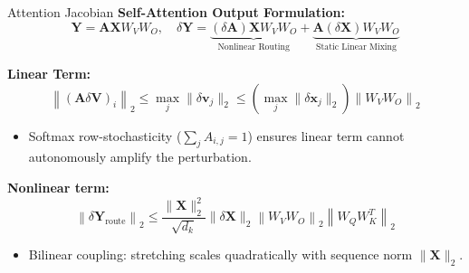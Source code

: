\documentclass[10pt,aspectratio=169]{beamer}
\begin{document}
\begin{frame}{Attention Jacobian}
  \textbf{Self-Attention Output Formulation:}
  \begin{equation*}
    \mathbf{Y} = \mathbf{A} \mathbf{X} W_V W_O, \quad \delta \mathbf{Y} = \underbrace{(\delta \mathbf{A}) \mathbf{X} W_V W_O}_{\text{Nonlinear Routing}} + \underbrace{\mathbf{A} (\delta \mathbf{X}) W_V W_O}_{\text{Static Linear Mixing}}
  \end{equation*}

  \textbf{Linear Term:}
  \begin{equation*}
    \left\| (\mathbf{A} \delta \mathbf{V})_i \right\|_2 \le \max_j \|\delta \mathbf{v}_j\|_2 \le \left(\max_j \|\delta \mathbf{x}_j\|_2\right) \left\| W_V W_O \right\|_2
  \end{equation*}
  \begin{itemize}
    \item Softmax row-stochasticity ($\sum_j A_{i,j}=1$) ensures linear term cannot autonomously amplify the perturbation.
  \end{itemize}

  \textbf{Nonlinear term:}
  \begin{equation*}
    \left\| \delta \mathbf{Y}_{\text{route}} \right\|_2 \le \frac{\|\mathbf{X}\|_2^2}{\sqrt{d_k}} \|\delta \mathbf{X}\|_2 \left\|W_V W_O\right\|_2 \left\|W_Q W_K^T\right\|_2
  \end{equation*}
  \begin{itemize}
    \item Bilinear coupling: stretching scales quadratically with sequence norm $\|\mathbf{X}\|_2$.
  \end{itemize}
\end{frame}

      
\end{document}
